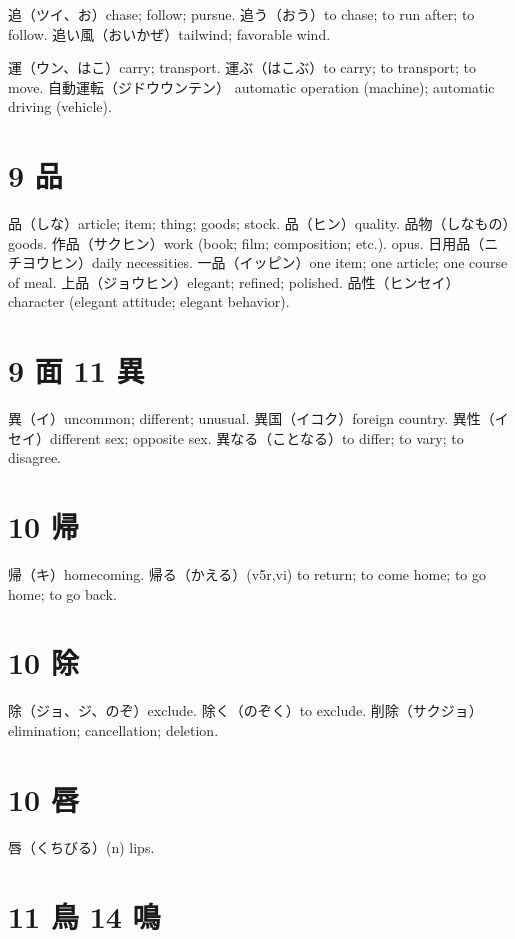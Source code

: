 追（ツイ、お）chase; follow; pursue.
追う（おう）to chase; to run after; to follow.
追い風（おいかぜ）tailwind; favorable wind.

運（ウン、はこ）carry; transport.
運ぶ（はこぶ）to carry; to transport; to move.
自動運転（ジドウウンテン）
automatic operation (machine); automatic driving (vehicle).

\section{9 品}

品（しな）article; item; thing; goods; stock.
品（ヒン）quality.
品物（しなもの）goods.
作品（サクヒン）work (book; film; composition; etc.). opus.
日用品（ニチヨウヒン）daily necessities.
一品（イッピン）one item; one article; one course of meal.
上品（ジョウヒン）elegant; refined; polished.
品性（ヒンセイ）character (elegant attitude; elegant behavior).

\section{9 面 11 異}

異（イ）uncommon; different; unusual.
異国（イコク）foreign country.
異性（イセイ）different sex; opposite sex.
異なる（ことなる）to differ; to vary; to disagree.

\section{10 帰}

帰（キ）homecoming.
帰る（かえる）(v5r,vi)
to return; to come home; to go home; to go back.

\section{10 除}

除（ジョ、ジ、のぞ）exclude.
除く（のぞく）to exclude.
削除（サクジョ）elimination; cancellation; deletion.

\section{10 唇}

唇（くちびる）(n) lips.

\section{11 鳥 14 鳴}

